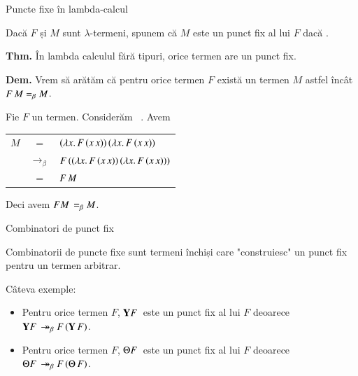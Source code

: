 \documentclass[xcolor=pdftex,romanian,colorlinks]{beamer}
\begin{document}
\begin{frame}{Puncte fixe în lambda-calcul}

Dacă $F$ și $M$ sunt $\lambda$-termeni, spunem că $M$ este un \alert{punct fix} al lui $F$ dacă .

\medskip
\alert{\textbf{Thm.} În lambda calculul fără tipuri, orice termen are un punct fix.}

\pause
\smallskip \textbf{Dem.} Vrem să arătăm că pentru orice termen $F$ există un termen $M$ astfel încât $F\, M =_\beta M$.

Fie $F$ un termen. Considerăm  . Avem
\vspace{-.2cm}
\begin{center}
\begin{tabular}{rcl}
$M$ & $=$ & $(\lambda x.\,F\, (x\, x))\, (\lambda x.\,F\, (x\, x))$ \\
& $\rightarrow_\beta$ & $F\, ((\lambda x.\,F\, (x\, x))\, (\lambda x.\,F\, (x\, x)))$ \\
& $=$ & $F\, M$
\end{tabular}
\end{center}
\vspace{-.2cm}
Deci avem $F M\, =_\beta M$.
\end{frame}

\begin{frame}{Combinatori de punct fix}

\alert{Combinatorii de puncte fixe} sunt termeni închiși care "construiesc" un punct fix pentru un termen arbitrar. 

\medskip
Câteva exemple:
\begin{itemize}
	\item  {}  

Pentru orice termen $F$, $\app{\mathbf{Y}{F}}$ este un punct fix al lui $F$ deoarece $\mathbf{Y}{F}\, \twoheadrightarrow_\beta F\, (\mathbf{Y}\, F)$.

	\smallskip
	\item {} 
	
	Pentru orice termen $F$, $\app{\Theta{F}}$ este un punct fix al lui $F$ deoarece $\Theta{F}\, \twoheadrightarrow_\beta F\, (\Theta\, F)$.
\end{itemize}
\end{frame}
\end{document}
